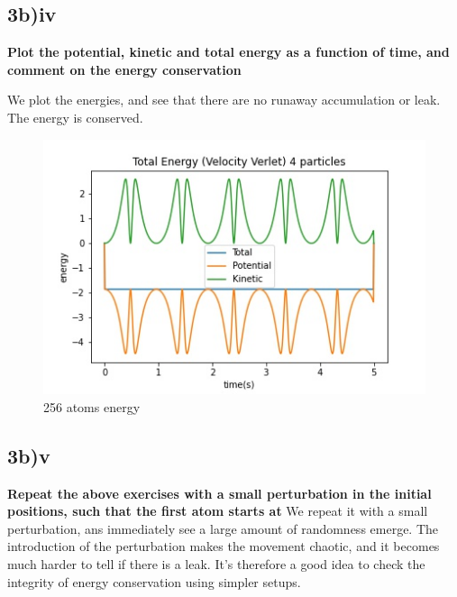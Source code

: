 \subsection*{3b)iv}
\textbf{Plot the potential, kinetic and total energy as a function of time, and comment on the energy
conservation}

We plot the energies, and see that there are no runaway accumulation or leak. The energy is conserved.

\begin{figure}[h!]
        \centering 
        \includegraphics[scale=0.6]{./py/3b_iv.jpg} 
        \caption{256 atoms energy}
        \label{fig:3biv}
\end{figure}

\subsection*{3b)v}
\textbf{Repeat the above exercises with a small perturbation in the initial positions, such that the first
atom starts at}
We repeat it with a small perturbation, ans immediately see a large amount of randomness emerge. The introduction of the perturbation makes the movement chaotic, and it becomes much harder to tell if there is a leak. It's therefore a good idea to check the integrity of energy conservation using simpler setups.


